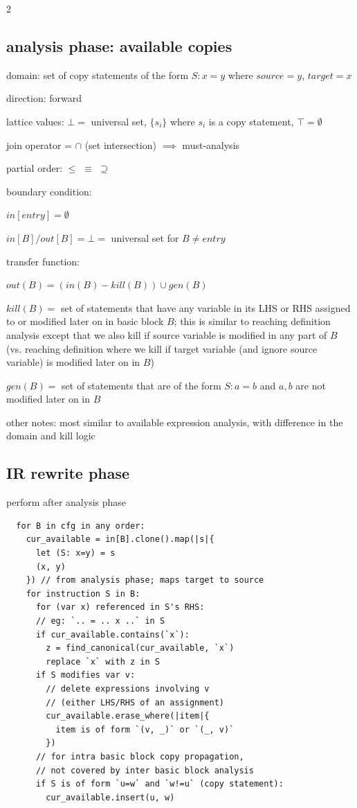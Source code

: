 \documentclass[8pt]{extarticle}
\begin{document}
\begin{multicols*}{2}
  \subsection{analysis phase: available copies}
  
  domain: set of copy statements of the form $S: x = y$ where $source=y$, $target=x$

  direction: forward

  lattice values: $\bot =$ universal set, $\{ s_i \}$ where $s_i$ is a copy statement, $\top = \emptyset$

  join operator = $\cap$ (set intersection) $\implies$ must-analysis

  partial order: $\leq$ $\equiv$ $\supseteq$

  boundary condition:

  $in[entry] = \emptyset$

  $in[B] / out[B] = \bot =$ universal set for $B \neq entry$

  transfer function:

  $out(B) = (in(B) - kill(B)) \cup gen(B)$

  $kill(B) =$ set of statements that have any variable in its LHS or RHS assigned to or modified later on in basic block $B$; this is similar to reaching definition analysis except that we also kill if source variable is modified in any part of $B$ (vs. reaching definition where we kill if target variable (and ignore source variable) is modified later on in $B$)

  $gen(B) =$ set of statements that are of the form $S: a = b$ and $a, b$ are not modified later on in $B$

  other notes: most similar to available expression analysis, with difference in the domain and kill logic

  \subsection{IR rewrite phase}

  perform after analysis phase

  \begin{verbatim}
  for B in cfg in any order:
    cur_available = in[B].clone().map(|s|{
      let (S: x=y) = s
      (x, y)
    }) // from analysis phase; maps target to source
    for instruction S in B:
      for (var x) referenced in S's RHS:
      // eg: `.. = .. x ..` in S
      if cur_available.contains(`x`):
        z = find_canonical(cur_available, `x`)
        replace `x` with z in S
      if S modifies var v:
        // delete expressions involving v
        // (either LHS/RHS of an assignment)
        cur_available.erase_where(|item|{
          item is of form `(v, _)` or `(_, v)`
        })
      // for intra basic block copy propagation,
      // not covered by inter basic block analysis
      if S is of form `u=w` and `w!=u` (copy statement):
        cur_available.insert(u, w)


\end{verbatim}
\end{multicols*}
\end{document}
